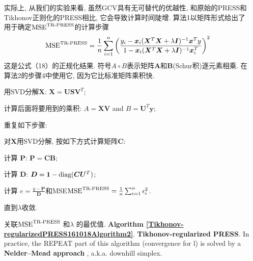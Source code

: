 实际上, 从我们的实验来看, 虽然GCV具有无可替代的优越性, 和原始的PRESS和Tikhonov正则化的PRESS相比, 它会导致计算时间陡增. 算法1以矩阵形式给出了用于确定$\textup{MSE}^{\textup{TR-PRESS}}$的计算步骤
\begin{align}
  \textup{MSE}^{\textup{TR-PRESS}}=\frac 1 n \sum_{i=1}^n \left( \frac{y_i-\bm x_i(\bm X^T \bm X+\lambda \bm I)^{-1}\bm x^T y  }
       {1-\bm x_i(\bm X^T \bm X+\lambda \bm I)^{-1}\bm x_i^T}\right)^2
\end{align}
这是公式（18）的正规化结果.
符号$A\circ B$表示矩阵$\bm A$和$\bm B$(Schur积)逐元素相乘.
在算法2的步骤4中使用它, 因为它比标准矩阵乘积快.

用SVD分解$\bm X$: $\bm X = \bm U\bm S\bm V^T$;

计算后面将要用到的乘积: $A = \bm X\bm V$ and $B = \bm U^T\bm y$;

重复如下步骤:

对$\bm X$用SVD分解, 按如下方式计算矩阵$\bm C$:

计算 $\bm P$: $\bm P = \bm C\bm B$;

计算 $\bm D$: $\bm D = \bm 1-\textup{diag}(\bm C\bm U^T)$;

计算 $e = \frac{y-\bm P} {\bm D}$和MSE$\textup{MSE}^{\textup{TR-PRESS}}=\frac 1 n \sum_{i=1}^n \epsilon_i^2$.

直到$\lambda$收敛.

关联$\textup{MSE}^{\textup{TR-PRESS}}$ 和$\lambda$ 的最优值.
\textbf{Algorithm \ref{Tikhonov-regularizedPRESS161018Algorithm2}}. \textbf{Tikhonov-regularized PRESS}. In practice, the REPEAT part of this algorithm (convergence for l) is solved by a \textbf{Nelder–Mead approach}  \cite{Nelder1965A}, a.k.a. downhill simplex.

